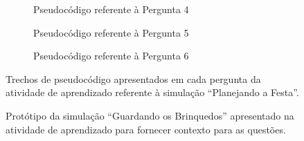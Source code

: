 \begin{figure}[h!]
    \par\bigskip %
    \begin{subfigure}[t]{0.5\textwidth}
        \centering
        \setlength{\fboxrule}{0.1pt} %
        \caption{Pseudocódigo referente à Pergunta 4}
        \label{figure:atividade_festa_4}
    \end{subfigure}
    \par\bigskip %
    \begin{subfigure}[t]{0.5\textwidth}
        \centering
        \setlength{\fboxrule}{0.1pt} %
        \caption{Pseudocódigo referente à Pergunta 5}
        \label{figure:atividade_festa_5}
    \end{subfigure}
    \par\bigskip %
    \begin{subfigure}[t]{0.5\textwidth}
        \centering
        \setlength{\fboxrule}{0.1pt} %
        \caption{Pseudocódigo referente à Pergunta 6}
        \label{figure:atividade_festa_6}
    \end{subfigure}
    \caption{Trechos de pseudocódigo apresentados em cada pergunta da atividade de aprendizado referente à simulação \enquote{Planejando a Festa}.}
    \label{figure:atividade_festa}
\end{figure}

\begin{figure}[h!]
    \centering
    \setlength{\fboxrule}{0.1pt} %
    \caption{Protótipo da simulação \enquote{Guardando os Brinquedos} apresentado na atividade de aprendizado para fornecer contexto para as questões.}
    \label{figure:brinquedos_forms}
\end{figure}

